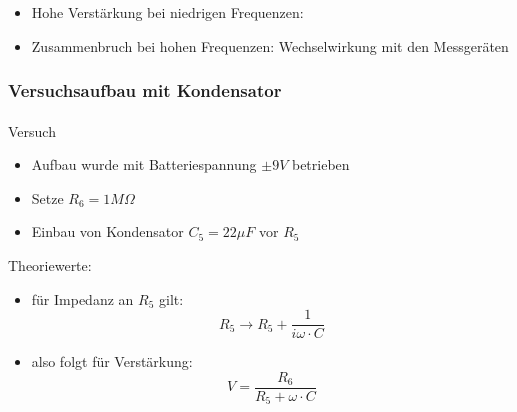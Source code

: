\begin{frame}
\begin{columns}[c]
\begin{figure}[H]
\begin{center}
        \end{center}
        \end{figure}
    \end{columns}
    \begin{block}{}
        \begin{itemize}
            \item Hohe Verstärkung bei niedrigen Frequenzen: 
            \item Zusammenbruch bei hohen Frequenzen: Wechselwirkung mit den
            Messgeräten
        \end{itemize}
    \end{block}
\end{frame}

\begin{frame}
\frametitle{Versuchsaufbau mit Kondensator}
\framesubtitle{}
    \begin{block}{Versuch}
        \begin{itemize}
            \item Aufbau wurde mit Batteriespannung $\pm 9V$ betrieben
            \item Setze $R_6 = 1M\Omega$
            \item Einbau von Kondensator $C_5 = 22\mu F$ vor $R_5$
        \end{itemize}    
    \end{block}    
    \begin{block}{Theoriewerte:}
    \begin{itemize}
        \item für Impedanz an $R_5$ gilt:
            \begin{equation*}
                R_5 \rightarrow R_5 + \frac{1}{i \omega \cdot C}    
            \end{equation*}
        \item also folgt für Verstärkung:
            \begin{equation*}
                V = \frac{R_6}{R_5 + \omega \cdot C}
            \end{equation*}
    \end{itemize}
    \end{block}
\end{frame}

